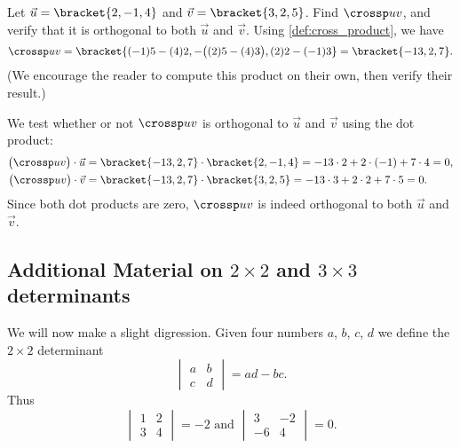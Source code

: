 \begin{example}\label{ex_crossp1}
Let $\vec u = \bracket{2,-1,4}$ and $\vec v = \bracket{3,2,5}$. Find $\crossp uv$, and verify that it is orthogonal to both $\vec u$ and $\vec v$.
\solution
Using \autoref{def:cross_product}, we have
\[
\crossp uv = \bracket{(-1)5-(4)2,-\bigl((2)5-(4)3\bigr), (2)2-(-1)3}=\bracket{-13,2,7}.
\] 
(We encourage the reader to compute this product on their own, then verify their result.)

We test whether or not $\crossp uv$ is orthogonal to $\vec u$ and $\vec v$ using the dot product:
\begin{align*}
\bigl(\crossp uv\bigr) \cdot \vec u
 &=\bracket{-13,2,7}\cdot\bracket{2,-1,4}=-13\cdot2+2\cdot(-1)+7\cdot4=0, \\
\bigl(\crossp uv\bigr) \cdot \vec v
 &=\bracket{-13,2,7}\cdot\bracket{3,2,5}=-13\cdot3+2\cdot2+7\cdot5=0.
\end{align*}
Since both dot products are zero, $\crossp uv$ is indeed orthogonal to both $\vec u$ and $\vec v$.
\end{example}

\subsection{Additional Material on \texorpdfstring{$2\times2$ and $3\times3$}{2x2 and 3x3} determinants}

We will now make a slight digression.  Given four numbers $a$, $b$, $c$, $d$ we define the $2 \times 2$ determinant
\[\begin{vmatrix}a & b \\ c & d\end{vmatrix} = ad - bc.\]
Thus
\[
\begin{vmatrix}1 & 2 \\3 & 4\end{vmatrix} = -2
\text{ and }
\begin{vmatrix}3 & -2 \\ -6 & 4\end{vmatrix} = 0.
\]

